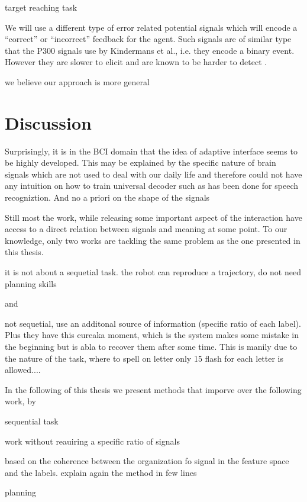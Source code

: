 target reaching task

We will use a different type of error related potential signals which will encode a ``correct'' or ``incorrect'' feedback for the agent. Such signals are of similar type that the P300 signals use by Kindermans et al., i.e. they encode a binary event. However they are slower to elicit and are known to be harder to detect .

we believe our approach is more general

\section{Discussion}

Surprisingly, it is in the BCI domain that the idea of adaptive interface seems to be highly developed. This may be explained by the specific nature of brain signals which are not used to deal with our daily life and therefore could not have any intuition on how to train universal decoder such as has been done for speech recogniztion. And no a priori on the shape of the signals

Still most the work, while releasing some important aspect of the interaction have access to a direct relation between signals and meaning at some point. To our knowledge, only two works are tackling the same problem as the one presented in this thesis.

 
\cite{cederborg2011imitating}
it is not about a sequetial task. the robot can reproduce a trajectory, do not need planning skills

and

\cite{Kindermans2012a,Kindermans2012b,kindermans2014integrating} not sequetial, use an additonal source of information (specific ratio of each label). Plus they have this eureaka moment, which is the system makes some mistake in the beginning but is abla to recover them after some time. This is manily due to the nature of the task, where to spell on letter only 15 flash for each letter is allowed....

In the following of this thesis we present methods that imporve over the following work, by

sequential task

work without reauiring a specific ratio of signals

based on the coherence between the organization fo signal in the feature space and the labels. explain again the method in few lines

planning

